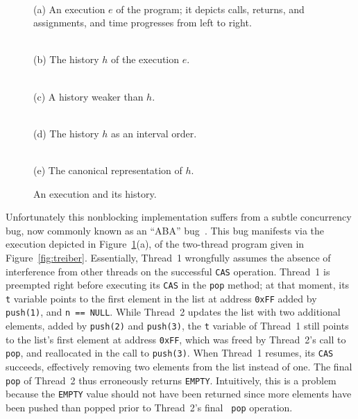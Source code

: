 \begin{figure}[t]
  \footnotesize
  \centering
   \\
  \smallskip
  \parbox{0.8\linewidth}{(a) An execution $e$ of the program; it depicts calls,
  returns, and assignments, and time progresses from left to right.}

  \bigskip
  \begin{minipage}{43mm}
     \\
    (b) The history $h$ of the execution $e$.
  \end{minipage}
  \begin{minipage}{40mm}
     \\
    (c) A history weaker than $h$.
  \end{minipage}

  \bigskip
   \\
  (d) The history $h$ as an interval order.

  \bigskip
   \\
  (e) The canonical representation of $h$.

  \caption{An execution and its history.}
  \label{fig:stacks}
    \vspace{-3mm}
\end{figure}

Unfortunately this nonblocking implementation suffers from a subtle concurrency
bug, now commonly known as an ``ABA'' bug~\cite{tr/ibm/Michael04}. This bug
manifests via the execution depicted in Figure~\ref{fig:stacks}(a), of the two-thread
program given in Figure~\ref{fig:treiber}.
Essentially, Thread~1 wrongfully assumes the absence of interference from other
threads on the successful {\tt CAS} operation. Thread~1 is preempted right
before executing its {\tt CAS} in the {\tt pop} method; at that moment, its
{\tt t} variable points to the first element in the list at address {\tt 0xFF}
added by {\tt push(1)}, and {\tt n == NULL}. While Thread~2 updates the list
with two additional elements, added by {\tt push(2)} and {\tt push(3)}, the
{\tt t} variable of Thread~1 still points to the list's first element at
address {\tt 0xFF}, which was freed by Thread~2's call to {\tt pop}, and
reallocated in the call to {\tt push(3)}. When Thread~1 resumes, its {\tt CAS}
succeeds, effectively removing two elements from the list instead of one. The
final {\tt pop} of Thread~2 thus erroneously returns {\tt EMPTY}. Intuitively,
this is a problem because the {\tt EMPTY} value should not have been returned
since more elements have been pushed than popped prior to Thread~2's final {\tt
pop} operation.

